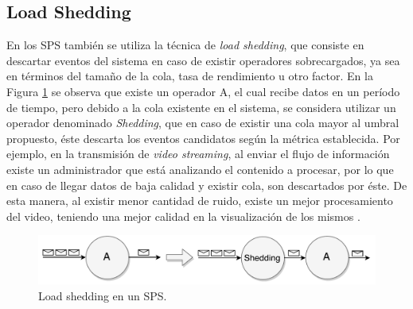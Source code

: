 

\subsection{Load Shedding}
\label{sec:loadSheddingBC}

En los SPS tambi\'en se utiliza la t\'ecnica de \textit{load shedding}, que consiste en descartar eventos del sistema en caso de existir operadores sobrecargados, ya sea \normalsize{en t\'erminos del} tama\~no de la cola, tasa de rendimiento u otro factor. En la Figura \ref{fig:loadShedding} se observa que existe un operador A, el cual recibe datos en un per\'iodo de tiempo, pero debido a la cola existente en el sistema, se considera utilizar un operador denominado \textit{Shedding}, que en caso de existir una cola mayor al umbral propuesto, \'este descarta los eventos candidatos seg\'un la m\'etrica establecida. Por ejemplo, en la transmisi\'on de \textit{video streaming}, al enviar el flujo de informaci\'on existe un administrador que est\'a analizando el contenido a procesar, por lo que en caso de llegar datos de baja calidad y existir cola, son descartados por \'este. De esta manera, al existir menor cantidad de ruido, existe un mejor procesamiento del video, teniendo una mejor calidad en la visualizaci\'on de los mismos \citep{SheuC09}. 

\begin{figure}[!ht]
	\centering
	\includegraphics[scale=0.6]{images/LoadShedding.pdf}
	\caption{Load shedding en un SPS.}
	\label{fig:loadShedding}
\end{figure}

